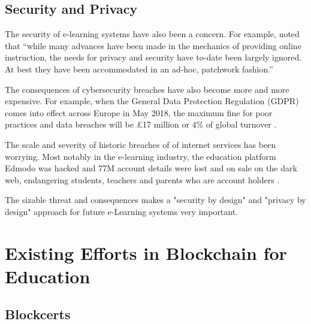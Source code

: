 \subsection{Security and Privacy}

The security of e-learning systems have also been a concern. For example, \citet{el2003privacy} noted that “while many 
advances have been made in the mechanics of providing online instruction, the needs for privacy and security have to-date 
been largely ignored. At best they have been accommodated in an ad-hoc, patchwork fashion.”

The consequences of cybersecurity breaches have also become more and more expensive. For example, when the General Data 
Protection Regulation (GDPR) comes into effect across Europe in May 2018, the maximum fine for poor practices and data 
breaches will be £17 million or 4\% of global turnover \citep{ico2017gdpr}.

The scale and severity of historic breaches of of internet services has been worrying. Most notably in the e-learning 
industry, the education platform Edmodo was hacked and 77M account details were lost and on sale on the dark 
web, endangering students, teachers and parents who are account holders \citep{opsecmonkey2017edmodo}.

The sizable threat and consequences makes a "security by design" and "privacy by design" approach for future e-Learning 
systems very important.

\section{Existing Efforts in Blockchain for Education}


\subsection{Blockcerts}

